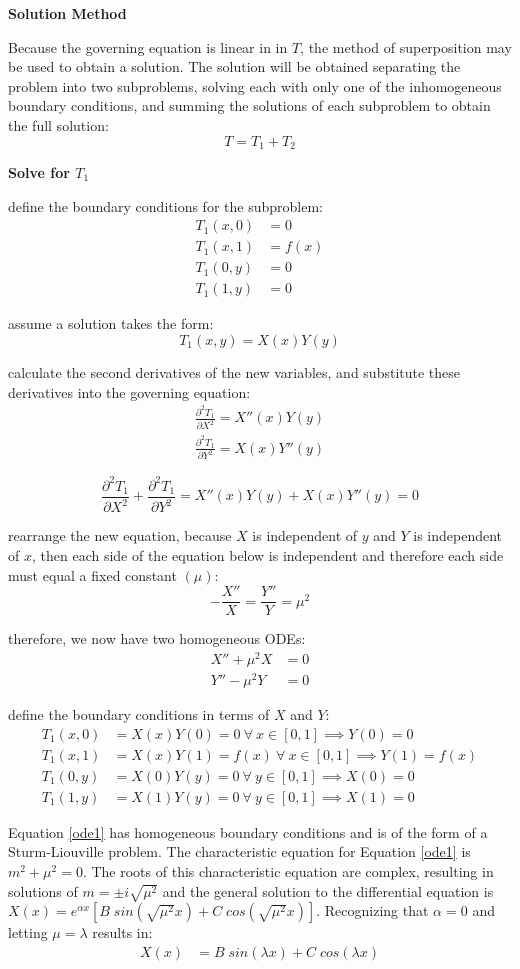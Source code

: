 \documentclass[letterpaper, 10pt, oneside]{article}
\newenvironment{dd}[1]{
	\noindent
	\textbf{\normalsize{#1}}
	\hspace{0.1in}
	\small
	\rmfamily
	}
	{\medskip}
\newcommand{\bes}{\begin{equation*}}
\newcommand{\ees}{\end{equation*}}
\newcommand{\as}[1]{\begin{align*}#1\end{align*}}
\newcommand{\an}[1]{\begin{align}#1\end{align}}
\newcommand{\bdd}{\begin{dd}}
\newcommand{\edd}{\end{dd}}
\begin{document}
\bdd{Solution Method}
	Because the governing equation is linear in in $T$, the method of superposition may be used to obtain a solution. The solution will be obtained separating the problem into two subproblems, solving each with only one of the inhomogeneous boundary conditions, and summing the solutions of each subproblem to obtain the full solution: $$ T = T_1 + T_2$$
\edd

\bdd{Solve for $T_1$}

	define the boundary conditions for the subproblem:
	\as{T_1(x, 0) & = 0\\
		T_1(x, 1) & = f(x) \\
		T_1(0, y) & = 0 \\
		T_1(1, y) & = 0}

	assume a solution takes the form: $$T_1(x,y)=X(x)Y(y)$$

	calculate the second derivatives of the new variables, and substitute these derivatives into the governing equation: 
	\as{\frac{\partial^2T_1}{\partial X^2} = X''(x)Y(y) \\
	\frac{\partial^2T_1}{\partial Y^2} = X(x)Y''(y)}

	\bes
	\frac{\partial^2T_1}{\partial X^2} + \frac{\partial^2T_1}{\partial Y^2}= X''(x)Y(y) + X(x)Y''(y) =0
	\ees

	rearrange the new equation, because $X$ is independent of $y$ and $Y$ is independent of $x$, then each side of the equation below is independent and therefore each side must equal a fixed constant $(\mu)$:
	\bes -\frac{X''}{X} = \frac{Y''}{Y} = \mu^2 \ees

	therefore, we now have two homogeneous ODEs: 
	\an{X'' + \mu^2 X &= 0 \label{ode1} \\ Y''-\mu^2 Y &= 0\label{ode2}}

	define the boundary conditions in terms of $X$ and $Y$:
	\as{T_1(x, 0) & = X(x)Y(0) = 0 \ \forall \ x \in [0,1] \implies Y(0) = 0\\
		T_1(x, 1) & = X(x)Y(1) = f(x) \ \forall \ x \in [0,1] \implies Y(1) = f(x) \\
		T_1(0, y) & = X(0)Y(y) = 0 \ \forall \ y \in [0,1] \implies X(0) = 0 \\
		T_1(1, y) & = X(1)Y(y) = 0 \ \forall \ y \in [0,1] \implies X(1) = 0}

	Equation \ref{ode1} has homogeneous boundary conditions and is of the form of a Sturm-Liouville problem. The characteristic equation for Equation \ref{ode1} is $m^2 + \mu^2 = 0$.  The roots of this characteristic equation are complex, resulting in solutions of $m = \pm i \sqrt{\mu^2}$ and the general solution to the differential equation is $X(x) = e^{\alpha x} \left[B\; sin(\sqrt{\mu^2} x) + C\; cos(\sqrt{\mu^2} x) \right]$. Recognizing that $\alpha = 0$ and letting $\mu = \lambda$ results in:
	\as{X(x) &= B\; sin(\lambda x) + C\; cos(\lambda x)} 
\end{document}
